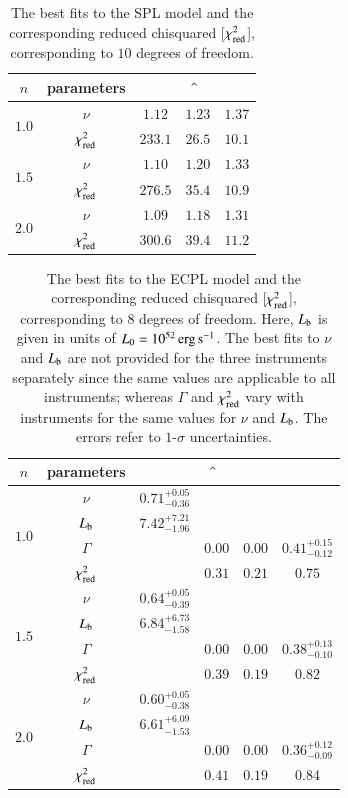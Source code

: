 \begin{table}
\caption[SPL model mismatch]{The best fits to the SPL model and the corresponding reduced chisquared [$\chi_{{\rm red}}^{2}$], corresponding to $10$ degrees of freedom.}
\label{tab:SPL_fits--short}
\begin{center}
\begin{tabular}{|c|c|c|c|c|}
\hline
$n$ & parameters & \B & \f & \s \\
\hline
\multirow{2}{*}{$1.0$} & $\nu$ & $1.12$ & $1.23$ & $1.37$ \\
 & $\chi_{{\rm red}}^{2}$ & $233.1$ & $26.5$ & $10.1$ \\
\hline
\multirow{2}{*}{$1.5$} & $\nu$ & $1.10$ & $1.20$ & $1.33$ \\
 & $\chi_{{\rm red}}^{2}$ & $276.5$ & $35.4$ & $10.9$ \\
\hline
\multirow{2}{*}{$2.0$} & $\nu$ & $1.09$ & $1.18$ & $1.31$ \\
 & $\chi_{{\rm red}}^{2}$ & $300.6$ & $39.4$ & $11.2$ \\
\hline
\end{tabular}
\end{center}
\end{table}

\begin{table}
\caption[ECPL model fits]{The best fits to the ECPL model and the corresponding reduced chisquared [$\chi_{{\rm red}}^{2}$], corresponding to $8$ degrees of freedom. Here, $L_{\rm{b}}$ is given in units of $L_{0} = 10^{52} \, \rm erg \, s^{-1}$. The best fits to $\nu$ and $L_{\rm{b}}$ are not provided for the three instruments separately since the same values are applicable to all instruments; whereas $\Gamma$ and $\chi_{{\rm red}}^{2}$ vary with instruments for the same values for $\nu$ and $L_{\rm{b}}$. The errors refer to $1$-$\sigma$ uncertainties.}
\label{tab:ECPL_fits--short}
\begin{center}
\begin{tabular}{|c|c|c|c|c|c|}
\hline
$n$ & parameters &  & \f & \s & \B \\
\hline
\multirow{4}{*}{$1.0$} & $\nu$ & $0.71 ^{+0.05} _{-0.36}$ & & & \\
 & $L_{\rm{b}}$ & $7.42 ^{+7.21} _{-1.96}$ & & & \\
 & $\Gamma$ & & $0.00$ & $0.00$ & $0.41 ^{+0.15} _{-0.12}$ \\
 & $\chi_{{\rm red}}^{2}$ & & $0.31$ & $0.21$ & $0.75$ \\
\hline
\multirow{4}{*}{$1.5$} & $\nu$ & $0.64 ^{+0.05} _{-0.39}$ & & & \\
 & $L_{\rm{b}}$ & $6.84 ^{+6.73} _{-1.58}$ & & & \\ 
 & $\Gamma$ & & $0.00$ & $0.00$ & $0.38 ^{+0.13} _{-0.10}$ \\
 & $\chi_{{\rm red}}^{2}$ & & $0.39$ & $0.19$ & $0.82$ \\
\hline
\multirow{4}{*}{$2.0$} & $\nu$ & $0.60 ^{+0.05} _{-0.38}$ & & & \\
 & $L_{\rm{b}}$ & $6.61 ^{+6.09} _{-1.53}$ & & & \\
 & $\Gamma$ & & $0.00$ & $0.00$ & $0.36 ^{+0.12} _{-0.09}$ \\
 & $\chi_{{\rm red}}^{2}$ & & $0.41$ & $0.19$ & $0.84$ \\
\hline
\end{tabular}
\end{center}
\end{table}

